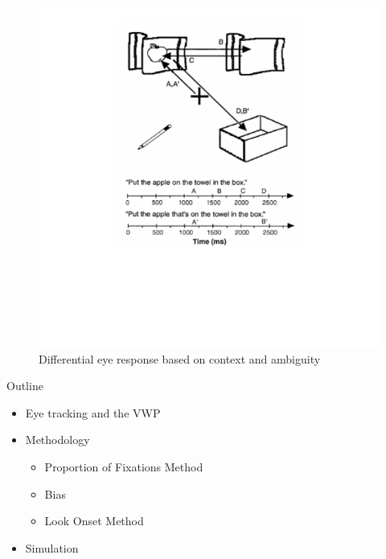 \documentclass{beamer}
\newcommand{\vp}{\vspace{2mm}}
\begin{document}
\begin{frame}%
\begin{figure}
\centering
\includegraphics[width=\textwidth]{apple_combine_half.pdf}
\caption{Differential eye response based on context and ambiguity}
\end{figure}
\end{frame}


\begin{frame}{Outline}\large


\begin{itemize}
	\item Eye tracking and the VWP \vp
	\item Methodology 
	\begin{itemize}
	\item Proportion of Fixations Method
	\item Bias
	\item Look Onset Method \vp
	\end{itemize}
	\item Simulation
\end{itemize}

\end{frame}
\end{document}
